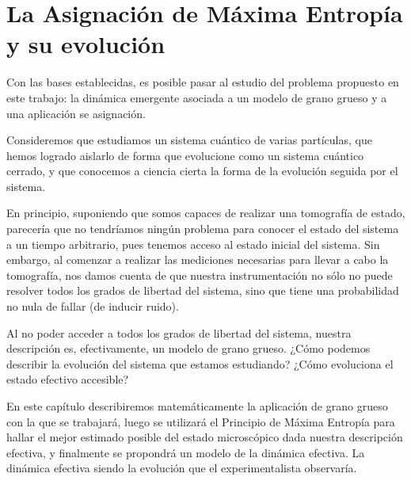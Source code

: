 \chapter{La Asignación de Máxima Entropía y su evolución}\label{ch:3}


Con las bases establecidas, es posible pasar al estudio del problema propuesto en este trabajo: la dinámica emergente asociada a un modelo de grano grueso y a una aplicación se asignación.

Consideremos que estudiamos un sistema cuántico de varias partículas, que hemos logrado aislarlo de forma que evolucione como un sistema cuántico cerrado, y que conocemos a ciencia cierta la forma de la evolución seguida por el sistema.

En principio, suponiendo que somos capaces de realizar una tomografía de estado, parecería que no tendríamos ningún problema para conocer el estado del sistema a un tiempo arbitrario, pues tenemos acceso al estado inicial del sistema. Sin embargo, al comenzar a realizar las mediciones necesarias para llevar a cabo la tomografía, nos damos cuenta de que nuestra instrumentación no sólo no puede resolver todos los grados de libertad del sistema, sino que tiene una probabilidad no nula de fallar (de inducir ruido).

Al no poder acceder a todos los grados de libertad del sistema, nuestra descripción es, efectivamente, un modelo de grano grueso. ¿Cómo podemos describir la evolución del sistema que estamos estudiando? ¿Cómo evoluciona el estado efectivo accesible?

En este capítulo describiremos matemáticamente la aplicación de grano grueso con la que se trabajará, luego se utilizará el Principio de Máxima Entropía para hallar el mejor estimado posible del estado microscópico dada nuestra descripción efectiva, y finalmente se propondrá un modelo de la dinámica efectiva. La dinámica efectiva siendo la evolución que el experimentalista observaría.





\newpage
